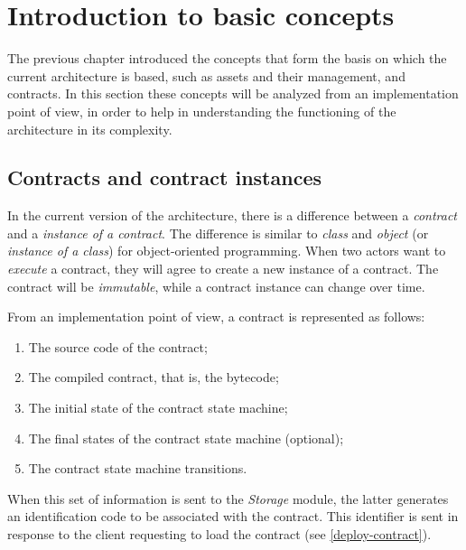 
\section{Introduction to basic concepts}

The previous chapter introduced the concepts that form the basis on which the current architecture is 
based, such as assets and their management, and contracts. In this section these concepts will be analyzed 
from an implementation point of view, in order to help in understanding the functioning of the 
architecture in its complexity.

\subsection{Contracts and contract instances}
\label{contract-and-contract-instances-implementation}

In the current version of the architecture, there is a difference between a \textit{contract} and a 
\textit{instance of a contract}. The difference is similar to \textit{class} and \textit{object} (or 
\textit{instance of a class}) for object-oriented programming. When two actors want to \textit{execute} a 
contract, they will agree to create a new instance of a contract. The contract will be 
\textit{immutable}, while a contract instance can change over time.

From an implementation point of view, a contract is represented as follows:
\begin{enumerate}
  \item The source code of the contract;
  \item The compiled contract, that is, the bytecode;
  \item The initial state of the contract state machine;
  \item The final states of the contract state machine (optional);
  \item The contract state machine transitions.
\end{enumerate}

When this set of information is sent to the \textit{Storage} module, the latter generates an 
identification code to be associated with the contract. This identifier is sent in response to the client 
requesting to load the contract (see \ref{deploy-contract}). 


